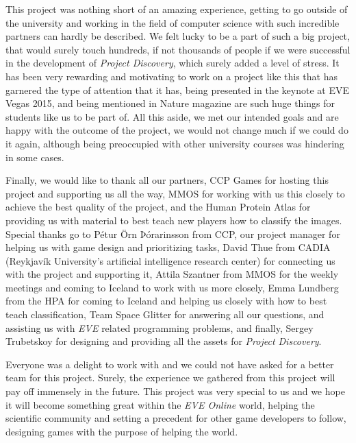 This project was nothing short of an amazing experience, getting to go outside of the university and working in the field of computer science with such incredible partners can hardly be described. We felt lucky to be a part of such a big project, that would surely touch hundreds, if not thousands of people if we were successful in the development of \emph{Project Discovery}, which surely added a level of stress. It has been very rewarding and motivating to work on a project like this that has garnered the type of attention that it has, being presented in the keynote at EVE Vegas 2015, and being mentioned in Nature magazine are such huge things for students like us to be part of. All this aside, we met our intended goals and are happy with the outcome of the project, we would not change much if we could do it again, although being preoccupied with other university courses was hindering in some cases.

Finally, we would like to thank all our partners, CCP Games for hosting this project and supporting us all the way, MMOS for working with us this closely to achieve the best quality of the project, and the Human Protein Atlas for providing us with material to best teach new players how to classify the images. Special thanks go to Pétur Örn Þórarinsson from CCP, our project manager for helping us with game design and prioritizing tasks, David Thue from CADIA (Reykjavík University's artificial intelligence research center) for connecting us with the project and supporting it, Attila Szantner from MMOS for the weekly meetings and coming to Iceland to work with us more closely, Emma Lundberg from the HPA for coming to Iceland and helping us closely with how to best teach classification, Team Space Glitter for answering all our questions, and assisting us with \emph{EVE} related programming problems, and finally, Sergey Trubetskoy for designing and providing all the assets for \emph{Project Discovery}.

Everyone was a delight to work with and we could not have asked for a better team for this project. Surely, the experience we gathered from this project will pay off immensely in the future. This project was very special to us and we hope it will become something great within the \emph{EVE Online} world, helping the scientific community and setting a precedent for other game developers to follow, designing games with the purpose of helping the world.